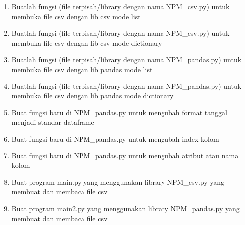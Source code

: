 \begin{enumerate}
\item
Buatlah fungsi (file terpisah/library dengan nama NPM\_csv.py) untuk membuka file csv dengan lib csv mode list
\item
Buatlah fungsi (file terpisah/library dengan nama NPM\_csv.py) untuk membuka file csv dengan lib csv mode dictionary
\item
Buatlah fungsi (file terpisah/library dengan nama NPM\_pandas.py) untuk membuka file csv dengan lib pandas mode list
\item
Buatlah fungsi (file terpisah/library dengan nama NPM\_pandas.py) untuk membuka file csv dengan lib pandas mode dictionary
\item
Buat fungsi baru di NPM\_pandas.py untuk mengubah format tanggal menjadi standar dataframe
\item
Buat fungsi baru di NPM\_pandas.py untuk mengubah index kolom
\item
Buat fungsi baru di NPM\_pandas.py untuk mengubah atribut atau nama kolom
\item
Buat program main.py yang menggunakan library NPM\_csv.py yang membuat dan membaca file csv
\item
Buat program main2.py yang menggunakan library NPM\_pandas.py yang membuat dan membaca file csv
\end{enumerate}




